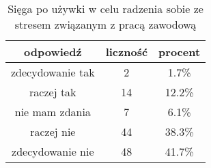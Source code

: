 \begin{table}[H]
\caption{Sięga po używki w celu radzenia sobie ze stresem związanym z pracą zawodową}
\centering
\begin{tabular}{ | c | c | c |}
\hline
odpowiedź & liczność & procent\\
\hline
zdecydowanie tak  &  2  & 1.7\% \\
\hline
raczej tak  &  14  & 12.2\% \\
\hline
nie mam zdania  &  7  & 6.1\% \\
\hline
raczej nie  &  44  & 38.3\% \\
\hline
zdecydowanie nie  &  48  & 41.7\% \\
\hline
\end{tabular}
\label{tab:Q13}
\end{table}
